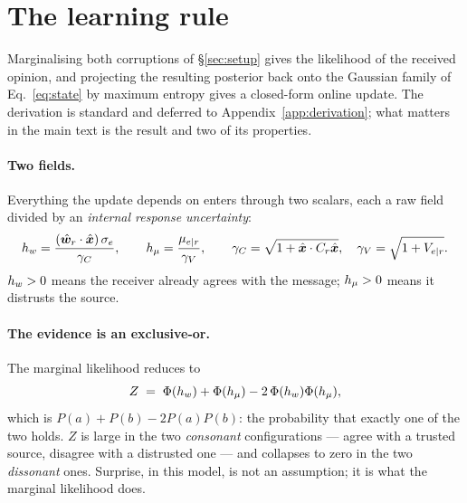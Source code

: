 \section{The learning rule}
\label{sec:rule}

Marginalising both corruptions of \S\ref{sec:setup} gives the likelihood of the
received opinion, and projecting the resulting posterior back onto the Gaussian
family of Eq.~\ref{eq:state} by maximum entropy gives a closed-form online update.
The derivation is standard and deferred to Appendix~\ref{app:derivation}; what
matters in the main text is the result and two of its properties.

\paragraph{Two fields.} Everything the update depends on enters through two
scalars, each a raw field divided by an \emph{internal response uncertainty}:
\begin{equation}
  h_{w} = \frac{(\hat{\bm{w}}_r \cdot \hat{\bm{x}})\,\sigma_e}{\gamma_C},
  \qquad
  h_{\mu} = \frac{\mu_{e|r}}{\gamma_V},
  \qquad
  \gamma_C = \sqrt{1 + \hat{\bm{x}} \cdot C_r \hat{\bm{x}}},
  \quad
  \gamma_V = \sqrt{1 + V_{e|r}}.
  \label{eq:fields}
\end{equation}
$h_{w} > 0$ means the receiver already agrees with the message; $h_{\mu} > 0$ means it
distrusts the source.

\paragraph{The evidence is an exclusive-or.} The marginal likelihood reduces to
\begin{equation}
  Z \;=\; \Phi(h_{w}) + \Phi(h_{\mu}) - 2\,\Phi(h_{w})\Phi(h_{\mu}),
  \label{eq:evidence}
\end{equation}
which is $P(a) + P(b) - 2P(a)P(b)$: the probability that exactly one of the two
holds. $Z$ is large in the two \emph{consonant} configurations --- agree with a
trusted source, disagree with a distrusted one --- and collapses to zero in the
two \emph{dissonant} ones. Surprise, in this model, is not an assumption; it is
what the marginal likelihood does.


